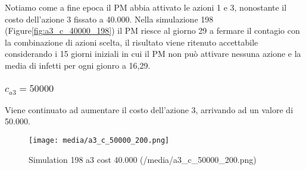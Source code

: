 \documentclass{article}
\begin{document}
{Notiamo come a fine epoca il PM abbia attivato le azioni 1 e 3, nonostante il costo dell'azione 3 fissato a 40.000. Nella simulazione 198 (Figure\ref{fig:a3_c_40000_198}) il PM riesce al giorno 29 a fermare il contagio con la combinazione di azioni scelta, il risultato viene ritenuto accettabile considerando i 15 giorni iniziali in cui il PM non può attivare nessuna azione e la media di infetti per ogni gionro a 16,29.

\subsubsection{$c_{a3} = 50000$}
Viene continuato ad aumentare il costo dell'azione 3, arrivando ad un valore di 50.000. \newline
\begin{figure}[H]
    \texttt{[image: media/a3\_c\_50000\_200.png]}
    \caption{Simulation 198 a3 cost 40.000 (/media/a3\_c\_50000\_200.png)}
    \label{fig:a3_c_50000_200}
\end{figure}

\printindex




}
\end{document}
